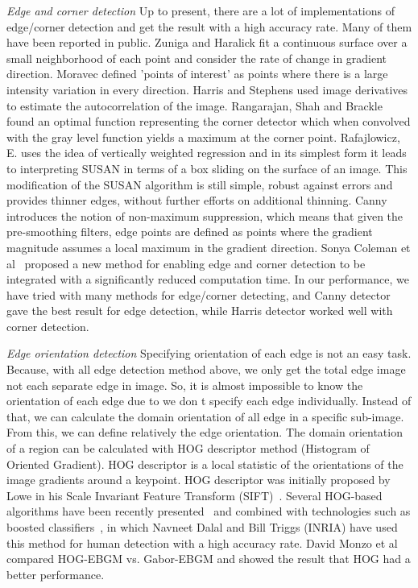 \textit{Edge and corner detection }
Up to present, there are a lot of implementations of edge/corner
detection and get the result with a high accuracy rate. Many of them
have been reported in public. Zuniga and Haralick fit a continuous
surface over a small neighborhood of each point and consider the
rate of change in gradient direction. Moravec defined 'points of interest' as points where there is a 
large intensity variation in every direction. Harris and Stephens used image derivatives to estimate the
autocorrelation of the image. Rangarajan, Shah and Brackle found an
optimal function representing the corner detector which when
convolved with the gray level function yields a maximum at the
corner point. Rafajlowicz, E. uses the idea of vertically weighted
regression and in its simplest form it leads to interpreting SUSAN in
terms of a box sliding on the surface of an image. This modification
of the SUSAN algorithm is still simple, robust against errors and
provides thinner edges, without further efforts on additional thinning.
Canny introduces the notion of non-maximum suppression, which
means that given the pre-smoothing filters, edge points are defined
as points where the gradient magnitude assumes a local maximum in
the gradient direction. Sonya Coleman et al~\cite{coleman2007integrated}
proposed a new method for enabling edge and corner detection to be
integrated with a significantly reduced computation time.
In our performance, we have tried with many methods for
edge/corner detecting, and Canny detector gave the
best result for edge detection, while Harris detector worked well with
corner detection.

\textit{Edge orientation detection }
Specifying orientation of each edge is not an easy task. Because,
with all edge detection method above, we only get the total edge
image not each separate edge in image. So, it is almost impossible to
know the orientation of each edge due to we don t specify each edge
individually. Instead of that, we can calculate the domain orientation
of all edge in a specific sub-image. From this, we can define
relatively the edge orientation. The domain orientation of a region
can be calculated with HOG descriptor method (Histogram of
Oriented Gradient). HOG descriptor is a local statistic of the
orientations of the image gradients around a keypoint. HOG
descriptor was initially proposed by Lowe in his Scale Invariant
Feature Transform (SIFT)~\cite{lowe2004distintive}. Several HOG-based algorithms have
been recently presented~\cite{bay2008surf} and combined with technologies such as
boosted classifiers~\cite{dalal2005histograms}, in which Navneet Dalal and Bill Triggs (INRIA) have
used this method for human detection with a high accuracy rate.
David Monzo et al~\cite{monzo2008hog} compared HOG-EBGM vs. Gabor-EBGM
and showed the result that HOG had a better performance.


